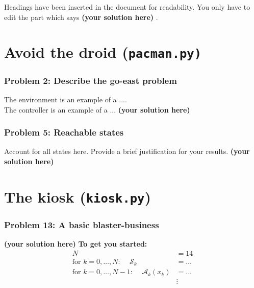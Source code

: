 \documentclass[12pt,twoside]{article}
\newcommand\redt[1]{ {\textcolor[rgb]{0.60, 0.00, 0.00}{\textbf{ #1} } } }
\newcommand{\yoursolution}{ \redt{(your solution here) } }
\begin{document}

Headings have been inserted in the document for readability. You only have to edit the part which says \yoursolution. 

\section{Avoid the droid (\texttt{pacman.py)}} 
\subsubsection*{{\color{red}Problem 2:  Describe the go-east problem}}
	
		The environment is an example of a .... \\		
		The controller is an example of a ...
		\yoursolution 	
	
\subsubsection*{{\color{red}Problem 5:  Reachable states}}
	
Account for all states here. Provide a brief justification for your results. 
		\yoursolution 	
	
\section{The kiosk (\texttt{kiosk.py})}
\subsubsection*{{\color{red}Problem 13:  A basic blaster-business}}

\yoursolution 	
\redt{To get you started: \begin{align}
	N & = 14 \\
	\mbox{for $k=0,\dots,N$: }\quad	\mathcal{S}_k & = \dots \\
	\mbox{for $k=0,\dots,N-1$: }\quad \mathcal{A}_k(x_k) & = \dots \\
	 & \vdots 
\end{align} }
\end{document}
